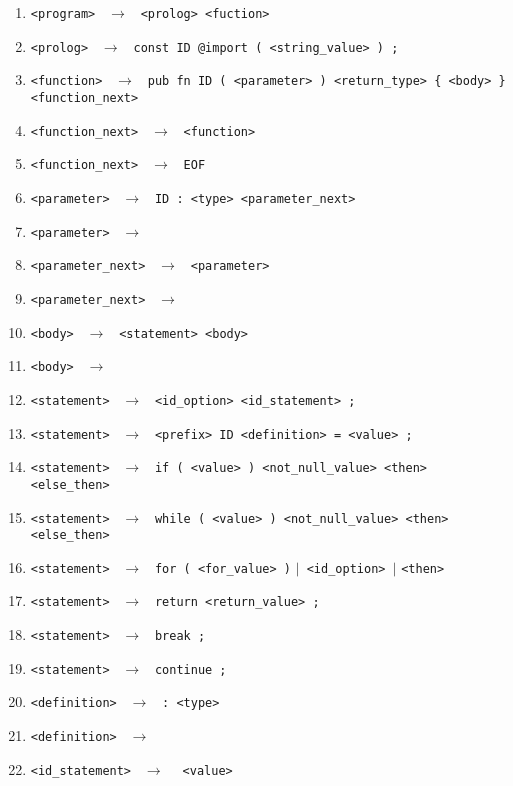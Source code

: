 \documentclass[a4paper, 11pt]{article}
\begin{document}
\begin{enumerate}
    \item \verb|<program> | $\rightarrow$ \verb| <prolog> <fuction>|
    \item \verb|<prolog> | $\rightarrow$ \verb| const ID @import ( <string_value> ) ;|
    \item \verb|<function> | $\rightarrow$ \verb| pub fn ID ( <parameter> ) <return_type> { <body> } <function_next>|
    \item \verb|<function_next> | $\rightarrow$ \verb| <function>|
    \item \verb|<function_next> | $\rightarrow$ \verb| EOF|
    \item \verb|<parameter> | $\rightarrow$ \verb| ID : <type> <parameter_next>|
    \item \verb|<parameter> | $\rightarrow \ \ $ \bm{$\varepsilon$}
    \item \verb|<parameter_next> | $\rightarrow$ \verb| <parameter>|
    \item \verb|<parameter_next> | $\rightarrow \ \ $ \bm{$\varepsilon$}
    \item \verb|<body> | $\rightarrow$ \verb| <statement> <body>|
    \item \verb|<body> | $\rightarrow \ \ $ \bm{$\varepsilon$}
    \item \verb|<statement> | $\rightarrow$ \verb| <id_option> <id_statement> ;|
    \item \verb|<statement> | $\rightarrow$ \verb| <prefix> ID <definition> = <value> ;|
    \item \verb|<statement> | $\rightarrow$ \verb| if ( <value> ) <not_null_value> <then> <else_then>|
    \item \verb|<statement> | $\rightarrow$ \verb| while ( <value> ) <not_null_value> <then> <else_then>|
    \item \verb|<statement> | $\rightarrow$ \verb| for ( <for_value> )| $|$\verb| <id_option> |$|$ \verb|<then>|
    \item \verb|<statement> | $\rightarrow$ \verb| return <return_value> ;|
    \item \verb|<statement> | $\rightarrow$ \verb| break ;|
    \item \verb|<statement> | $\rightarrow$ \verb| continue ;|
    \item \verb|<definition> | $\rightarrow$ \verb| : <type>|
    \item \verb|<definition> | $\rightarrow \ \ $ \bm{$\varepsilon$}
    \item \verb|<id_statement> | $\rightarrow \ \ $ \bm{$=$} \verb| <value>|

\end{enumerate}
\end{document}
